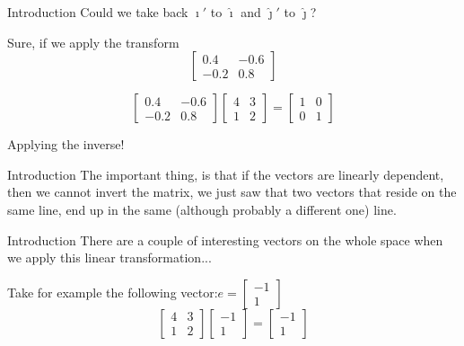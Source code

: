 \documentclass[aspectratio=169]{beamer}
\begin{document}
\begin{frame}{Introduction}
    Could we take back $\hat{\imath}'$ to $\hat{\imath}$ and $\hat{\jmath}'$ to $\hat{\jmath}$? \pause
    
    Sure, if we apply the transform \[\begin{bmatrix}0.4&-0.6\\-0.2&0.8\end{bmatrix}\] \pause
    
    \[\begin{bmatrix}0.4&-0.6\\-0.2&0.8\end{bmatrix}\begin{bmatrix}4&3\\1&2\end{bmatrix}=\begin{bmatrix}1&0\\0&1\end{bmatrix}\]
    
    Applying the inverse!
\end{frame}

\begin{frame}{Introduction}
    The important thing, is that if the vectors are linearly dependent, then we cannot invert the matrix, we just saw that two vectors that reside on the same line, end up in the same (although probably a different one) line.
\end{frame}

\begin{frame}{Introduction}
    There are a couple of interesting vectors on the whole space when we apply this linear transformation...
    
    Take for example the following vector:\(e=\begin{bmatrix}-1\\1\end{bmatrix}\)\pause
    \[\begin{bmatrix}4&3\\1&2\end{bmatrix}\begin{bmatrix}-1\\1\end{bmatrix}=\begin{bmatrix}-1\\1\end{bmatrix}\]
\end{frame}
\end{document}
